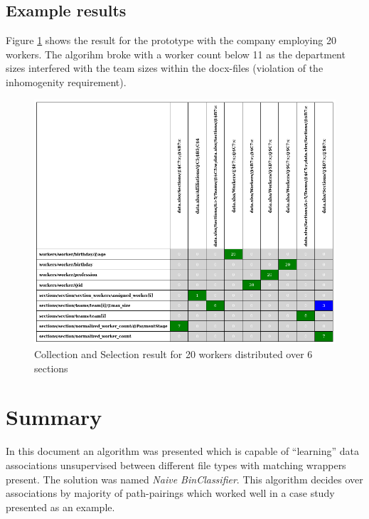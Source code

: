 \documentclass[conference]{IEEEtran}
\begin{document}
\subsection{Example results}
Figure \ref{example_table} shows the result for the prototype with the company employing 20
workers. The algorihm broke with a worker count below 11 as the department sizes interfered
with the team sizes within the docx-files (violation of the inhomogenity requirement).
\begin{figure}[ht]
 \centering
 \includegraphics[scale=0.42]{img/example_table}
 \caption{Collection and Selection result for 20 workers distributed over 6 sections}
 \label{example_table}
\end{figure}

\section{Summary}
In this document an algorithm was presented which is capable of ``learning'' data
associations unsupervised  between different file types with matching wrappers present.
The solution was named \textit{Naive BinClassifier}. This algorithm decides over
associations by majority of path-pairings which worked well in a case study presented
as an example. 

\printbibliography
\end{document}
